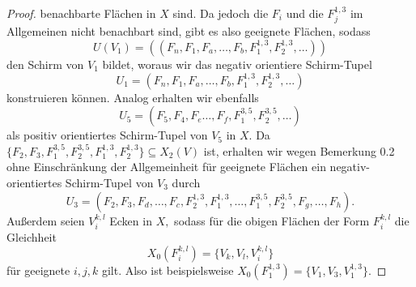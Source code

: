\documentclass[12pt,titlepage,twoside,cleardoublepage]{article}
\theoremstyle{nummermitklammern}
\numberwithin{equation}{section}
\begin{document}
\begin{proof}
benachbarte Flächen in $X$ sind. Da jedoch die $F_i$ und die $F_j^{1,3}$ im Allgemeinen nicht benachbart sind, gibt es also geeignete Flächen, sodass  
\[
U(V_1)=((F_n,F_1,F_a,\ldots,F_b,F^{1,3}_1,F^{1,3}_2,\ldots))
\]
den Schirm von $V_1$ bildet, woraus wir das negativ orientiere Schirm-Tupel
\[
U_1=(F_n,F_1,F_a,\ldots,F_b,F^{1,3}_1,F^{1,3}_2,\ldots)
\]  
konstruieren können.
Analog erhalten wir ebenfalls 
\[
U_5=(F_5,F_4,F_e\ldots,F_f,F^{3,5}_1,F^{3,5}_2,\ldots)
\] als positiv orientiertes Schirm-Tupel von $V_5$ in $X$. Da $\{F_2,F_3,F_1^{3,5},F_2^{3,5},F^{1,3}_1,F^{1,3}_2\}\subseteq X_2(V)$ ist,  erhalten wir wegen Bemerkung 0.2 ohne Einschränkung der Allgemeinheit für geeignete Flächen ein negativ-orientiertes Schirm-Tupel von $V_3$ durch
\[
U_3=(F_2,F_3,F_d,\ldots,F_c,F^{1,3}_2,F^{1,3}_1,\ldots,F_1^{3,5},F_2^{3,5},F_g,\ldots,F_h).
\]
Außerdem seien $V_i^{k,l}$ Ecken in $X,$ sodass für die obigen Flächen der Form $F_i^{k,l}$ die Gleichheit
\[
X_0(F^{k,l}_i)=\{V_k,V_l,V_i^{k,l}\}
\] für geeignete $i,j,k$ gilt. Also ist beispielsweise $X_0(F_1^{1,3})=\{V_1,V_3,V_1^{1,3}\}.$



\end{proof}
\end{document}
